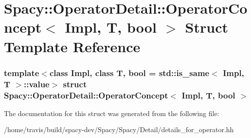 \hypertarget{structSpacy_1_1OperatorDetail_1_1OperatorConcept}{\section{\-Spacy\-:\-:\-Operator\-Detail\-:\-:\-Operator\-Concept$<$ \-Impl, \-T, bool $>$ \-Struct \-Template \-Reference}
\label{structSpacy_1_1OperatorDetail_1_1OperatorConcept}
}
\subsubsection*{template$<$class Impl, class T, bool = std\-::is\-\_\-same$<$ Impl, T $>$\-::value$>$ struct Spacy\-::\-Operator\-Detail\-::\-Operator\-Concept$<$ Impl, T, bool $>$}



\-The documentation for this struct was generated from the following file\-:\begin{DoxyCompactItemize}
\item 
/home/travis/build/spacy-\/dev/\-Spacy/\-Spacy/\-Detail/details\-\_\-for\-\_\-operator.\-hh\end{DoxyCompactItemize}
